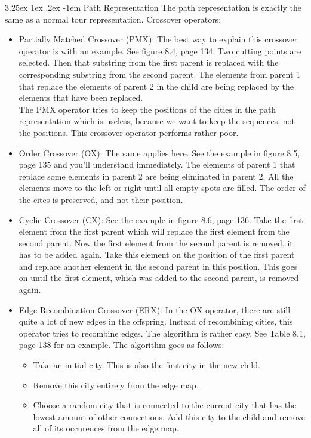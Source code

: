 \documentclass[12pt]{book}
\makeatletter
\renewcommand\paragraph{\@startsection{paragraph}{5}{\z@}%
  {3.25ex \@plus1ex \@minus.2ex}%
  {-1em}%
  {\normalfont\normalsize\bfseries}}
\makeatother
\begin{document}
\paragraph{Path Representation}
The path representation is exactly the same as a normal tour representation. Crossover operators:
\begin{itemize}
\item Partially Matched Crossover (PMX): The best way to explain this crossover operator is with an example. See figure 8.4, page 134. Two cutting points are selected. Then that substring from the first parent is replaced with the corresponding substring from the second parent. The elements from parent 1 that replace the elements of parent 2 in the child are being replaced by the elements that have been replaced.\\
The PMX operator tries to keep the positions of the cities in the path representation which is useless, because we want to keep the sequences, not the positions. This crossover operator performs rather poor.
\item Order Crossover (OX): The same applies here. See the example in figure 8.5, page 135 and you'll understand immediately. The elements of parent 1 that replace some elements in parent 2 are being eliminated in parent 2. All the elements move to the left or right until all empty spots are filled. The order of the cites is preserved, and not their position.
\item Cyclic Crossover (CX): See the example in figure 8.6, page 136. Take the first element from the first parent which will replace the first element from the second parent. Now the first element from the second parent is removed, it has to be added again. Take this element on the position of the first parent and replace another element in the second parent in this position. This goes on until the first element, which was added to the second parent, is removed again.
\item Edge Recombination Crossover (ERX): In the OX operator, there are still quite a lot of new edges in the offspring. Instead of recombining cities, this operator tries to recombine edges. The algorithm is rather easy. See Table 8.1, page 138 for an example. The algorithm goes as follows:
\begin{itemize}
\item Take an initial city. This is also the first city in the new child.
\item Remove this city entirely from the edge map.
\item Choose a random city that is connected to the current city that has the lowest amount of other connections. Add this city to the child and remove all of its occurences from the edge map.

\end{itemize}
\end{itemize}
\end{document}

